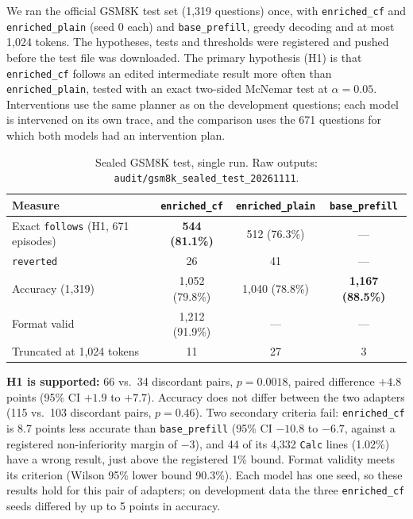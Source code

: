 \documentclass[11pt,a4paper]{article}
\begin{document}
We ran the official GSM8K test set (1,319 questions) once, with \texttt{enriched\_cf} and \texttt{enriched\_plain} (seed 0 each) and \texttt{base\_prefill}, greedy decoding and at most 1,024 tokens. The hypotheses, tests and thresholds were registered and pushed before the test file was downloaded. The primary hypothesis (H1) is that \texttt{enriched\_cf} follows an edited intermediate result more often than \texttt{enriched\_plain}, tested with an exact two-sided McNemar test at $\alpha = 0.05$. Interventions use the same planner as on the development questions; each model is intervened on its own trace, and the comparison uses the 671 questions for which both models had an intervention plan.

\begin{table}[h]
\centering
\footnotesize
\begin{tabular}{lccc}
\toprule
\textbf{Measure} & \texttt{enriched\_cf} & \texttt{enriched\_plain} & \texttt{base\_prefill} \\
\midrule
Exact \texttt{follows} (H1, 671 episodes) & \textbf{544 (81.1\%)} & 512 (76.3\%) & --- \\
\texttt{reverted} & 26 & 41 & --- \\
Accuracy (1,319) & 1,052 (79.8\%) & 1,040 (78.8\%) & \textbf{1,167 (88.5\%)} \\
Format valid & 1,212 (91.9\%) & --- & --- \\
Truncated at 1,024 tokens & 11 & 27 & 3 \\
\bottomrule
\end{tabular}
\caption{Sealed GSM8K test, single run. Raw outputs: \texttt{audit/gsm8k\_sealed\_test\_20261111}.}
\label{tab:sealed}
\end{table}

\textbf{H1 is supported:} 66 vs.\ 34 discordant pairs, $p = 0.0018$, paired difference $+4.8$ points (95\% CI $+1.9$ to $+7.7$). Accuracy does not differ between the two adapters (115 vs.\ 103 discordant pairs, $p = 0.46$). Two secondary criteria fail: \texttt{enriched\_cf} is 8.7 points less accurate than \texttt{base\_prefill} (95\% CI $-10.8$ to $-6.7$, against a registered non-inferiority margin of $-3$), and 44 of its 4,332 \texttt{Calc} lines (1.02\%) have a wrong result, just above the registered 1\% bound. Format validity meets its criterion (Wilson 95\% lower bound 90.3\%). Each model has one seed, so these results hold for this pair of adapters; on development data the three \texttt{enriched\_cf} seeds differed by up to 5 points in accuracy.
\end{document}
